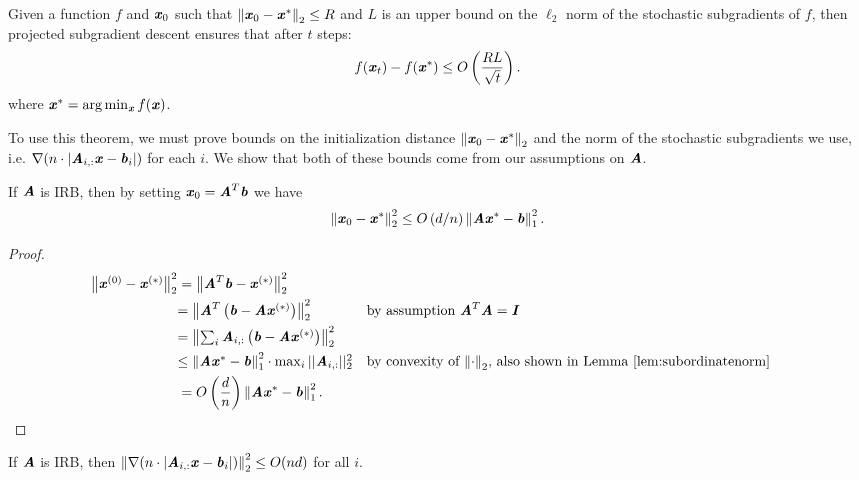 \begin{theorem}
	\label{thm:standardSGD}
	Given a function $f$ and $\xx_0$ such that
	$\norme{\xx_0 - \xx^*} \leq R$
	and $L$ is an upper bound on the $\ell_2$ norm of the stochastic subgradients of $f$,
	then projected subgradient descent ensures that after $t$ steps:
	\[
	f(\xx_t) - f(\xx^*) \leq O\left(\frac{RL}{\sqrt{t}}\right).
	\]
	where $\xx^* = \arg \min_{\xx} f(\xx)$.
\end{theorem}

To use this theorem, we must prove bounds on the initialization distance $\norme{\xx_0 -\xx^*}$ and the norm of the stochastic subgradients we use, i.e. $\nabla (n \cdot |\AA_{i,:}\xx - \bb_i|)$ for each $i$. We show that both of these bounds come from our assumptions on $\AA$.

\begin{lemma}\label{lem:easyInit}
	If $\AA$ is IRB, then by setting $\xx_0 = \AA^T\bb$ we have
	\[
	\norme{\xx_0 - \xx^*}^2 \leq O\left(d/n\right)\norm{\AA\xx^*-\bb}_1^2.
	\]
\end{lemma}

\begin{proof}
	\begin{align*}
	\textstyle{\norm{\xx^{\left( 0 \right)} - \xx^{\left( * \right)}}_{2}^2} & = \textstyle{\norm{\AA^T \bb - \xx^{\left( * \right)}}_{2}^2} \\
	& \textstyle{= \norm{\AA^T \left(\bb - \AA\xx^{(*)}\right)}_2^2} & &\text{by assumption $\AA^T\AA = \II$}\\
	& \textstyle{= \norme{\sum_i \AA_{i,:} \left(\bb - \AA\xx^{(*)}\right)}^2} \\
	& \textstyle{\leq \norm{\AA\xx^*-\bb}_1^2 \cdot \max_i ||\AA_{i,:}||_2^2} & & \text{by convexity of $\norm{\cdot}_2$, also shown in Lemma~\ref{lem:subordinatenorm}}\\
	& = O\left({\dfrac{d}{n}}\right)\norm{\AA\xx^*-\bb}_1^2.
	\end{align*}
\end{proof}

\begin{lemma}\label{lem:easyLipscitz}
		If $\AA$ is IRB, then $\norme{\nabla (n \cdot |\AA_{i,:}\xx - \bb_i|)}^2 \leq O(nd)$ for all $i$.
\end{lemma}

